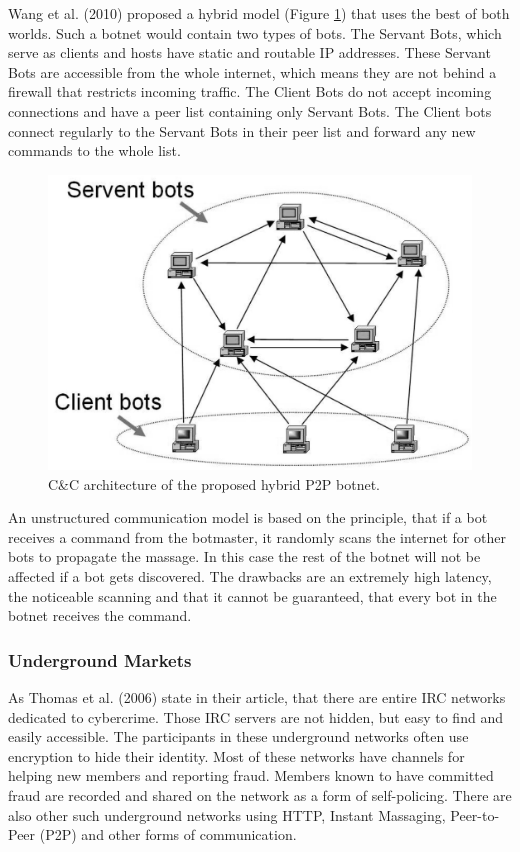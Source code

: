 Wang et al. (2010) proposed a hybrid model (Figure \ref{fig:hybrid}) that uses the best of both worlds. Such a botnet would contain two types of bots. The Servant Bots, which serve as clients and hosts have static and routable IP addresses. These Servant Bots are accessible from the whole internet, which means they are not behind a firewall that restricts incoming traffic. The Client Bots do not accept incoming connections and have a peer list containing only Servant Bots. The Client bots connect regularly to the Servant Bots in their peer list and forward any new commands to the whole list. \cite{Wang10}

\begin{figure}[ht]
\begin{center} \includegraphics[scale=0.3]{Talk11/CC-hybrid} \end{center}
\caption{C\&C architecture of the proposed hybrid P2P botnet. \cite{Wang10}}
\label{fig:hybrid}
\end{figure}

An unstructured communication model is based on the principle, that if a bot receives a command from the botmaster, it randomly scans the internet for other bots to propagate the massage. In this case the rest of the botnet will not be affected if a bot gets discovered. The drawbacks are an extremely high latency, the noticeable scanning and that it cannot be guaranteed, that every bot in the botnet receives the command. \cite{Cooke05}

		\subsubsection{Underground Markets}
As Thomas et al. (2006) state in their article, that there are entire IRC networks dedicated to cybercrime. Those IRC servers are not hidden, but easy to find and easily accessible. The participants in these underground networks often use encryption to hide their identity.
Most of these networks have channels for helping new members and reporting fraud. Members known to have committed fraud are recorded and shared on the network as a form of self-policing.
There are also other such underground networks using HTTP, Instant Massaging, Peer-to-Peer (P2P) and other forms of communication. \cite{Thomas06}

